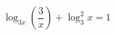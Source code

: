 \begin{ex}[type=equation]
	\begin{condition}
		$\log_{3x} \left(\dfrac{3}{x}\right) + \log_3^2 x  = 1$
	\end{condition}
\end{ex}
